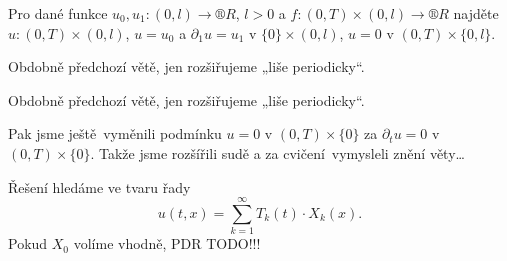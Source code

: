 \documentclass[12pt]{article}					%
\begin{document}
\begin{poznamka}
	Pro dané funkce $u_0, u_1: (0, l) \rightarrow ®R$, $l > 0$ a $f:(0, T) \times (0, l) \rightarrow ®R$ najděte $u: (0, T) \times (0, l)$, $u = u_0$ a $\partial_1 u = u_1$ v $\{0\} \times (0, l)$, $u = 0$ v $(0, T) \times \{0, l\}$.
\end{poznamka}

\begin{veta}
	Obdobně předchozí větě, jen rozšiřujeme „liše periodicky“.

	\begin{dukazin}
		Obdobně předchozí větě, jen rozšiřujeme „liše periodicky“.
	\end{dukazin}
\end{veta}

\begin{poznamka}
	Pak jsme ještě vyměnili podmínku $u = 0$ v $(0, T) \times \{0\}$ za $\partial_t u = 0$ v $(0, T) \times \{0\}$. Takže jsme rozšířili sudě a za cvičení vymysleli znění věty…
\end{poznamka}


\begin{definice}
	Řešení hledáme ve tvaru řady
	$$ u(t, x) = \sum_{k=1}^∞ T_k(t)·X_k(x). $$
	Pokud $X_0$ volíme vhodně, PDR TODO!!!
\end{definice}
\end{document}
